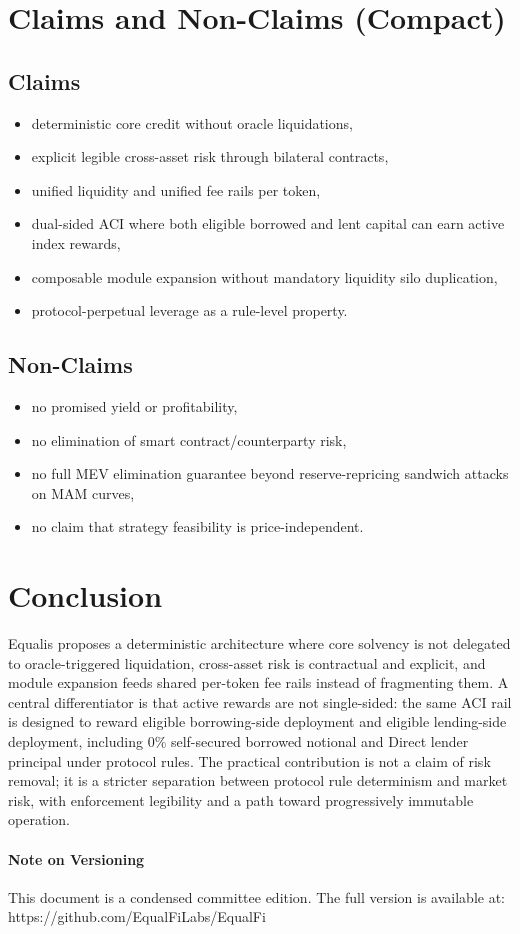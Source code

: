 \documentclass[version=preprint]{iacrcc}
\begin{document}
\section{Claims and Non-Claims (Compact)}

\subsection*{Claims}
\begin{itemize}
  \item deterministic core credit without oracle liquidations,
  \item explicit legible cross-asset risk through bilateral contracts,
  \item unified liquidity and unified fee rails per token,
  \item dual-sided ACI where both eligible borrowed and lent capital can earn active index rewards,
  \item composable module expansion without mandatory liquidity silo duplication,
  \item protocol-perpetual leverage as a rule-level property.
\end{itemize}

\subsection*{Non-Claims}
\begin{itemize}
  \item no promised yield or profitability,
  \item no elimination of smart contract/counterparty risk,
  \item no full MEV elimination guarantee beyond reserve-repricing sandwich attacks on MAM curves,
  \item no claim that strategy feasibility is price-independent.
\end{itemize}

\section{Conclusion}

Equalis proposes a deterministic architecture where core solvency is not delegated to oracle-triggered liquidation, cross-asset risk is contractual and explicit, and module expansion feeds shared per-token fee rails instead of fragmenting them. A central differentiator is that active rewards are not single-sided: the same ACI rail is designed to reward eligible borrowing-side deployment and eligible lending-side deployment, including 0\% self-secured borrowed notional and Direct lender principal under protocol rules. The practical contribution is not a claim of risk removal; it is a stricter separation between protocol rule determinism and market risk, with enforcement legibility and a path toward progressively immutable operation.

\paragraph*{Note on Versioning}
This document is a condensed committee edition. The full version is available at: https://github.com/EqualFiLabs/EqualFi
\end{document}
